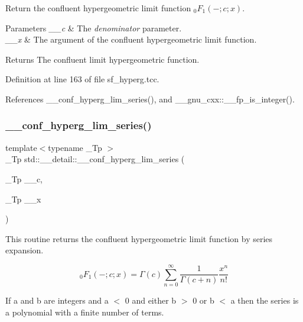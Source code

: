 Return the confluent hypergeometric limit function $ {}_0F_1(-;c;x) $. 


\begin{DoxyParams}{Parameters}
{\em \+\_\+\+\_\+c} & The {\itshape denominator} parameter. \\
\hline
{\em \+\_\+\+\_\+x} & The argument of the confluent hypergeometric limit function. \\
\hline
\end{DoxyParams}
\begin{DoxyReturn}{Returns}
The confluent limit hypergeometric function. 
\end{DoxyReturn}


Definition at line 163 of file sf\+\_\+hyperg.\+tcc.



References \+\_\+\+\_\+conf\+\_\+hyperg\+\_\+lim\+\_\+series(), and \+\_\+\+\_\+gnu\+\_\+cxx\+::\+\_\+\+\_\+fp\+\_\+is\+\_\+integer().

\mbox{\label{namespacestd_1_1____detail_a44b73ec79e0a8cfd1f29a21cb39f2bdc}} 
\subsubsection{\texorpdfstring{\+\_\+\+\_\+conf\+\_\+hyperg\+\_\+lim\+\_\+series()}{\_\_conf\_hyperg\_lim\_series()}}
{\footnotesize\ttfamily template$<$typename \+\_\+\+Tp $>$ \\
\+\_\+\+Tp std\+::\+\_\+\+\_\+detail\+::\+\_\+\+\_\+conf\+\_\+hyperg\+\_\+lim\+\_\+series (\begin{DoxyParamCaption}\item[{\+\_\+\+Tp}]{\+\_\+\+\_\+c,  }\item[{\+\_\+\+Tp}]{\+\_\+\+\_\+x }\end{DoxyParamCaption})}



This routine returns the confluent hypergeometric limit function by series expansion. 

\[ {}_0F_1(-;c;x) = \Gamma(c) \sum_{n=0}^{\infty} \frac{1}{\Gamma(c+n)} \frac{x^n}{n!} \]

If a and b are integers and a $<$ 0 and either b $>$ 0 or b $<$ a then the series is a polynomial with a finite number of terms.


